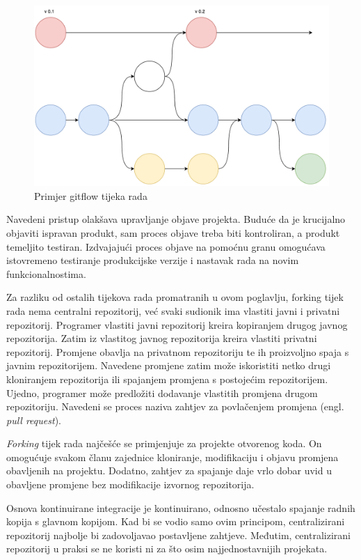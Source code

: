 \documentclass[times, utf8, diplomski, numeric]{fer}
\newcommand{\eng}[1]{(engl. \textit{#1})}
\begin{document}
\begin{figure}
\centering
\includegraphics[scale=0.5]{Gitflow}
\caption{Primjer gitflow tijeka rada}
\label{fig:Gitflow}
\end{figure}

Navedeni pristup olakšava upravljanje objave projekta. Buduće da je krucijalno objaviti ispravan produkt, sam proces objave treba biti kontroliran, a produkt temeljito testiran. Izdvajajući proces objave na pomoćnu granu omogućava istovremeno testiranje produkcijske verzije i nastavak rada na novim funkcionalnostima.

Za razliku od ostalih tijekova rada promatranih u ovom poglavlju, forking tijek rada nema centralni repozitorij, već svaki sudionik ima vlastiti javni i privatni repozitorij. Programer vlastiti javni repozitorij kreira kopiranjem drugog javnog repozitorija. Zatim iz vlastitog javnog repozitorija kreira vlastiti privatni repozitorij. Promjene obavlja na privatnom repozitoriju te ih proizvoljno spaja s javnim repozitorijem. Navedene promjene zatim može iskoristiti netko drugi kloniranjem repozitorija ili spajanjem promjena s postojećim repozitorijem. Ujedno, programer može predložiti dodavanje vlastitih promjena drugom repozitoriju. Navedeni se proces naziva zahtjev za povlačenjem promjena \eng{pull request}.

\textit{Forking} tijek rada najčešće se primjenjuje za projekte otvorenog koda. On omogućuje svakom članu zajednice kloniranje, modifikaciju i objavu promjena obavljenih na projektu. Dodatno, zahtjev za spajanje daje vrlo dobar uvid u obavljene promjene bez modifikacije izvornog repozitorija.

Osnova kontinuirane integracije je kontinuirano, odnosno učestalo spajanje radnih kopija s glavnom kopijom. Kad bi se vodio samo ovim principom, centralizirani repozitorij najbolje bi zadovoljavao postavljene zahtjeve. Međutim, centralizirani repozitorij u praksi se ne koristi ni za što osim najjednostavnijih projekata.
\end{document}
